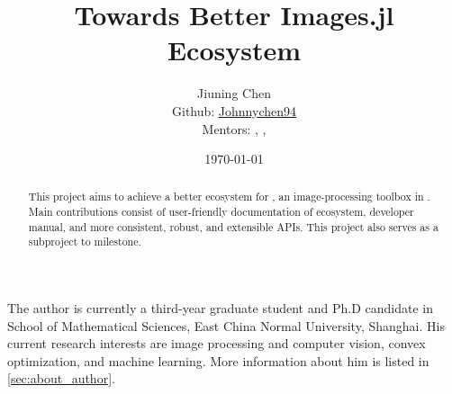 \documentclass[12pt, a4paper]{article}
\title{Towards Better Images.jl Ecosystem}
\author{Jiuning Chen\mailto{johnnychen94@hotmail.com}\\
Github: \href{https://github.com/johnnychen94}{Johnnychen94}\\
Mentors: \zygmunt, \julio, \timholy
}
\date{\today}
\begin{document}
\maketitle

\renewcommand\abstractname{Abstract}
\begin{abstract}
    This project aims to achieve a better ecosystem for \href{https://juliaimages.org/latest/}{\images}, an image-processing toolbox in \href{https://julialang.org/}{\langjulia}. Main contributions consist of user-friendly documentation of \images{} ecosystem, developer manual, and more consistent, robust, and extensible APIs. This project also serves as a subproject to \images{}  milestone.
\end{abstract}

\noindent The author is currently a third-year graduate student and Ph.D candidate in School of Mathematical Sciences, East China Normal University, Shanghai. His current research interests are image processing and computer vision, convex optimization, and machine learning. More information about him is listed in \cref{sec:about_author}.\par

\renewcommand\contentsname{Table of Contents}
\tableofcontents

\newpage






\end{document}
